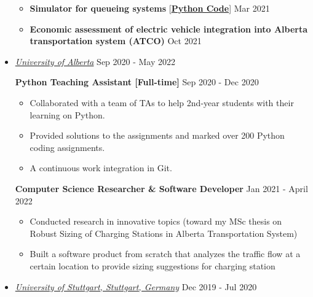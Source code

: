 \documentclass[10pt,letterpaper,roman]{moderncv} %
\begin{document}
\begin{itemize}
\begin{itemize}
		\item\textbf{Simulator for queueing systems} [\href{https://github.com/Hadi2525/queueing_theory}{\textbf{Python Code}}] \hfill Mar 2021
	 	\item \textbf{Economic assessment of electric vehicle integration into Alberta transportation system (ATCO)} \hfill Oct 2021
	\end{itemize}

\vspace{0.5cm}
	\item \href{http://ualberta.ca/}{ \emph{\large University of Alberta}} \hfill Sep 2020 - May 2022
	
	
	
	\textbf{Python Teaching Assistant [Full-time]} \hfill Sep 2020 - Dec 2020
	\begin{itemize}
		\item Collaborated with a team of TAs to help 2nd-year students with their learning on Python.
		\item Provided solutions to the assignments and marked over 200 Python coding assignments.
		\item A continuous work integration in Git.
	\end{itemize}

	\textbf{Computer Science Researcher \& Software Developer} \hfill Jan 2021 - April 2022
	\begin{itemize}
		\item Conducted research in innovative topics (toward my MSc thesis on Robust Sizing of Charging Stations in Alberta Transportation System)
		\item Built a software product from scratch that analyzes the traffic flow at a certain location to provide sizing suggestions for charging station
	\end{itemize}
\vspace{0.5cm}

	\item \href{https://www.iaas.uni-stuttgart.de/en}{ \emph{\large University of Stuttgart, Stuttgart, Germany}} \hfill Dec 2019 - Jul 2020
	\vspace{0.25cm}
	

\end{itemize}
\end{document}
